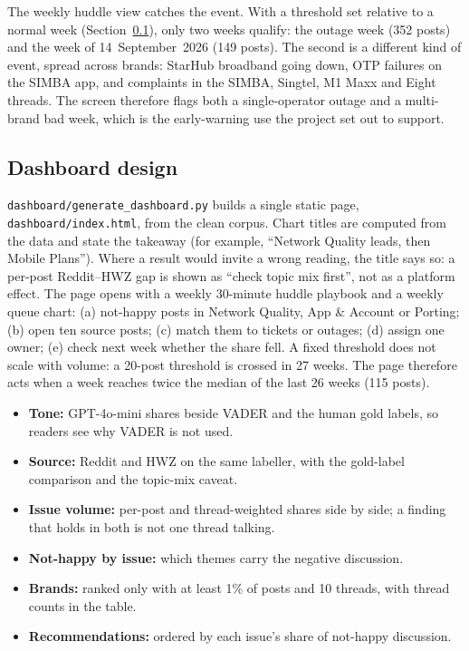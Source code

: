 \documentclass[11pt,a4paper]{article}
\begin{document}
The weekly huddle view catches the event. With a threshold set relative to a normal week (Section~\ref{sec:dashboard}), only two weeks qualify: the outage week (352 posts) and the week of 14~September~2026 (149 posts). The second is a different kind of event, spread across brands: StarHub broadband going down, OTP failures on the SIMBA app, and complaints in the SIMBA, Singtel, M1 Maxx and Eight threads. The screen therefore flags both a single-operator outage and a multi-brand bad week, which is the early-warning use the project set out to support.

\subsection{Dashboard design}
\label{sec:dashboard}

\texttt{dashboard/generate\_dashboard.py} builds a single static page, \texttt{dashboard/index.html}, from the clean corpus. Chart titles are computed from the data and state the takeaway (for example, ``Network Quality leads, then Mobile Plans''). Where a result would invite a wrong reading, the title says so: a per-post Reddit--HWZ gap is shown as ``check topic mix first'', not as a platform effect. The page opens with a weekly 30-minute huddle playbook and a weekly queue chart: (a) not-happy posts in Network Quality, App \& Account or Porting; (b) open ten source posts; (c) match them to tickets or outages; (d) assign one owner; (e) check next week whether the share fell. A fixed threshold does not scale with volume: a 20-post threshold is crossed in 27 weeks. The page therefore acts when a week reaches twice the median of the last 26 weeks (115 posts).

\begin{itemize}
  \item \textbf{Tone:} GPT-4o-mini shares beside VADER and the human gold labels, so readers see why VADER is not used.
  \item \textbf{Source:} Reddit and HWZ on the same labeller, with the gold-label comparison and the topic-mix caveat.
  \item \textbf{Issue volume:} per-post and thread-weighted shares side by side; a finding that holds in both is not one thread talking.
  \item \textbf{Not-happy by issue:} which themes carry the negative discussion.
  \item \textbf{Brands:} ranked only with at least 1\% of posts and 10 threads, with thread counts in the table.
  \item \textbf{Recommendations:} ordered by each issue's share of not-happy discussion.
\end{itemize}
\end{document}
